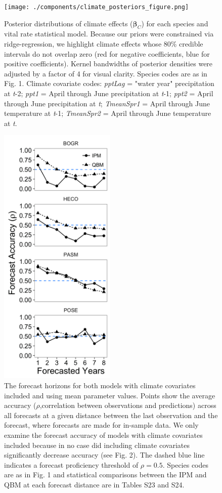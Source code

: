 \documentclass[12pt,]{article}
\begin{document}
\newpage{}

\begin{figure}[!ht]
  \centering
      \texttt{[image: ./components/climate\_posteriors\_figure.png]}
  \caption{Posterior distributions of climate effects ($\boldsymbol{\beta}_C$) for each species and vital rate statistical model. Because our priors were constrained via ridge-regression, we highlight climate effects whose 80\% credible intervals do not overlap zero (red for negative coefficients, blue for positive coefficients). Kernel bandwidths of posterior densities were adjusted by a factor of 4 for visual clarity. Species codes are as in Fig. 1. Climate covariate codes: \emph{pptLag} = "water year" precipitation at \emph{t}-2; \emph{ppt1} = April through June precipitation at \emph{t}-1; \emph{ppt2} = April through June precipitation at \emph{t}; \emph{TmeanSpr1} = April through June temperature at \emph{t}-1; \emph{TmeanSpr2} = April through June temperature at \emph{t}.}
\end{figure}

\newpage{}

\begin{figure}[!ht]
  \centering
      \includegraphics[height=5in]{./components/forecast_horizon.png}
  \caption{The forecast horizons for both models with climate covariates included and using mean parameter values. Points show the average accuracy ($\rho$,correlation between observations and predictions) across all forecasts at a given distance between the last observation and the forecast, where forecasts are made for in-sample data. We only examine the forecast accuracy of models with climate covariates included because in no case did including climate covariates significantly decrease accuracy (see Fig. 2). The dashed blue line indicates a forecast proficiency threshold of $\rho = 0.5$. Species codes are as in Fig. 1 and statistical comparisons between the IPM and QBM at each forecast distance are in Tables S23 and S24.}
\end{figure}
\end{document}
